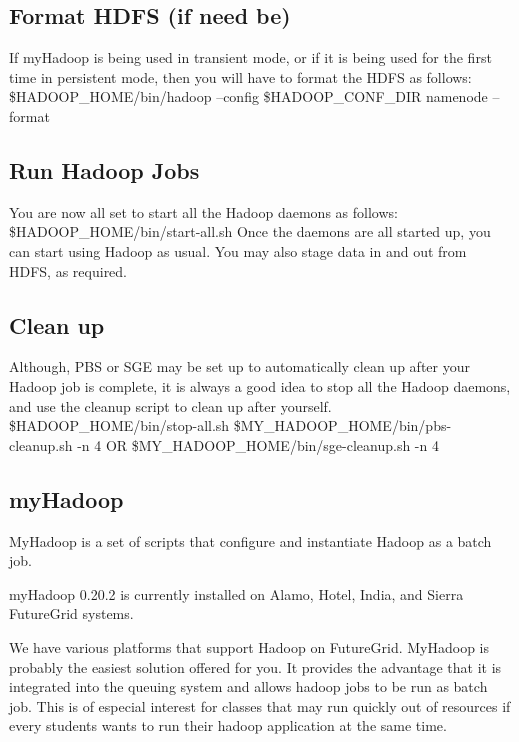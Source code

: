 \subsection{Format HDFS (if need be)}

If myHadoop is being used in transient mode, or if it is being used for the first time in
persistent mode, then you will have to format the HDFS as follows:
\$HADOOP\_HOME/bin/hadoop --config \$HADOOP\_CONF\_DIR namenode –format

\subsection{Run Hadoop Jobs}

You are now all set to start all the Hadoop daemons as follows:
\$HADOOP\_HOME/bin/start-all.sh
Once the daemons are all started up, you can start using Hadoop as usual. You may also
stage data in and out from HDFS, as required.

\subsection{Clean up}

Although, PBS or SGE may be set up to automatically clean up after your Hadoop job is
complete, it is always a good idea to stop all the Hadoop daemons, and use the cleanup
script to clean up after yourself.
\$HADOOP\_HOME/bin/stop-all.sh
\$MY\_HADOOP\_HOME/bin/pbs-cleanup.sh -n 4 OR
\$MY\_HADOOP\_HOME/bin/sge-cleanup.sh -n 4


\subsection{myHadoop}

MyHadoop is a set of scripts that configure and instantiate Hadoop as a batch job.

myHadoop 0.20.2 is currently installed on Alamo, Hotel, India, and Sierra FutureGrid systems.



We have various platforms that support Hadoop on FutureGrid. MyHadoop is probably the easiest solution offered for you. It provides the advantage that it is integrated into the queuing system and allows hadoop jobs to be run as batch job. This is of especial interest for classes that may run quickly out of resources if every students wants to run their hadoop application at the same time.



